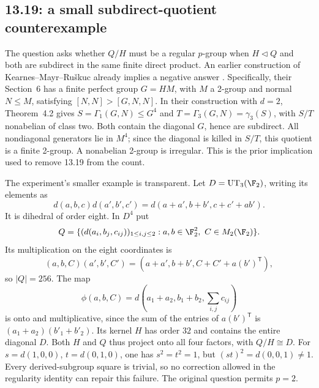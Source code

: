 \subsection{13.19: a small subdirect-quotient counterexample}
\label{prior:13.19}

The question asks whether \(Q/H\) must be a regular \(p\)-group
when \(H\lhd Q\) and both are subdirect in the same finite
direct product. An earlier construction of Kearnes--Mayr--Ru\v{s}kuc
already implies a negative answer \cite{kearnes-mayr-ruskuc}.
Specifically, their Section~6 has a finite perfect group \(G=HM\),
with \(M\) a 2-group and normal \(N\le M\), satisfying
\([N,N]>[G,N,N]\). In their construction with \(d=2\),
Theorem~4.2 gives \(S=\Gamma_1(G,N)\le G^4\) and
\(T=\Gamma_3(G,N)=\gamma_3(S)\), with \(S/T\) nonabelian
of class two. Both contain the diagonal \(G\), hence are
subdirect. All nondiagonal generators lie in \(M^4\);
since the diagonal is killed in \(S/T\), this quotient is
a finite 2-group. A nonabelian 2-group is irregular.
This is the prior implication used to remove 13.19 from the count.

The experiment's smaller example is transparent.
Let \(D=\operatorname{UT}_3(\F_2)\), writing its elements as
\[
 d(a,b,c)d(a',b',c')
   =d(a+a',b+b',c+c'+ab').
\]
It is dihedral of order eight. In \(D^4\) put
\[
 Q=\{(d(a_i,b_j,c_{ij}))_{1\le i,j\le2}:
                 a,b\in\F_2^2,\ C\in M_2(\F_2)\}.
\]
Its multiplication on the eight coordinates is
\[
 (a,b,C)(a',b',C')=(a+a',b+b',C+C'+a(b')^{\mathsf T}),
\]
so \(|Q|=256\). The map
\[
 \phi(a,b,C)=d(a_1+a_2,b_1+b_2,\textstyle\sum_{i,j}c_{ij})
\]
is onto and multiplicative, since the sum of the entries of
\(a(b')^{\mathsf T}\) is
\((a_1+a_2)(b'_1+b'_2)\).
Its kernel \(H\) has order \(32\) and contains the entire
diagonal \(D\). Both \(H\) and \(Q\) thus project onto all
four factors, with \(Q/H\cong D\).
For \(s=d(1,0,0)\), \(t=d(0,1,0)\), one has
\(s^2=t^2=1\), but \((st)^2=d(0,0,1)\ne1\).
Every derived-subgroup square is trivial, so no correction
allowed in the regularity identity can repair this failure.
The original question permits \(p=2\).

